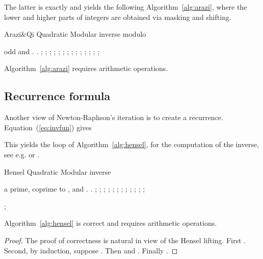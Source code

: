 The latter is exactly \cite[Theorem~1]{Arazi:2008:CMI} and yields the
following Algorithm~\ref{alg:arazi}, where the lower and higher parts of
integers are obtained via masking and shifting. 
\begin{algorithm}[htbp]
\caption{Arazi\&Qi Quadratic Modular inverse modulo }
\label{alg:arazi}
\begin{algorithmic}[1]
\REQUIRE  odd and .
\ENSURE .
\STATE ;
\FOR{(; ; )}
\STATE ;\hfill\COMMENT{}
\STATE ; ;\hfill\COMMENT{}
\STATE ;\hfill\COMMENT{}
\STATE ;\hfill\COMMENT{}
\STATE ;
\STATE ; ;\hfill\COMMENT{}
\STATE ;\hfill\COMMENT{}
\STATE ;\hfill\COMMENT{}
\STATE ;\hfill\COMMENT{}
\ENDFOR
\STATE ;\hfill\COMMENT{}
\RETURN ;
\end{algorithmic}
\end{algorithm}

\begin{lemma}\label{lem:ara} Algorithm~\ref{alg:arazi} requires  arithmetic operations.
\end{lemma}






\subsection{Recurrence formula}
Another view of Newton-Raphson's iteration is to create a recurrence. 
Equation~(\ref{eq:invfun}) gives 


This yields the loop of Algorithm~\ref{alg:hensel}, for the
computation of the inverse, 
see e.g. \cite{Krishnamurthy:1983:padic} or \cite[\S 2.4]{Brent:2011:MCA}.

\begin{algorithm}[htbp]
\caption{Hensel Quadratic Modular inverse}
\label{alg:hensel}
\begin{algorithmic}[1]
\REQUIRE  a prime,  coprime to ,  and .
\ENSURE .
\STATE ;\hfill{}
\FOR{(; ; )}
\STATE\label{lin:sqr} ;\hfill\COMMENT{} 
\STATE ;\hfill\COMMENT{} 
\STATE\label{lin:mod1} ;\hfill\COMMENT{}
\STATE ;\hfill\COMMENT{}
\STATE ;\hfill\COMMENT{}
\ENDFOR 
\STATE ;\hfill\COMMENT{} 
\STATE ;\hfill\COMMENT{} 
\STATE\label{lin:mod2} ;\hfill\COMMENT{}
\STATE ;\hfill\COMMENT{}
\STATE ;\hfill\COMMENT{}
\STATE ;\hfill\COMMENT{}

\RETURN ;
\end{algorithmic}
\end{algorithm}

\begin{lemma}\label{lem:rec} Algorithm~\ref{alg:hensel} is correct and requires 
 arithmetic operations.
\end{lemma}
\begin{proof} The proof of correctness is natural in view of the Hensel
lifting. First . Second, by induction, suppose 
. Then  and . Finally .
\end{proof}

